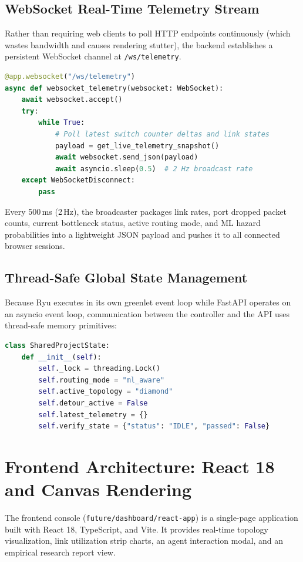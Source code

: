 \subsection{WebSocket Real-Time Telemetry Stream}
Rather than requiring web clients to poll HTTP endpoints continuously (which wastes bandwidth and causes rendering stutter), the backend establishes a persistent WebSocket channel at \texttt{/ws/telemetry}.
\begin{lstlisting}[language=Python,caption={FastAPI WebSocket telemetry broadcast loop.}]
@app.websocket("/ws/telemetry")
async def websocket_telemetry(websocket: WebSocket):
    await websocket.accept()
    try:
        while True:
            # Poll latest switch counter deltas and link states
            payload = get_live_telemetry_snapshot()
            await websocket.send_json(payload)
            await asyncio.sleep(0.5)  # 2 Hz broadcast rate
    except WebSocketDisconnect:
        pass
\end{lstlisting}
Every 500\,ms (2\,Hz), the broadcaster packages link rates, port dropped packet counts, current bottleneck status, active routing mode, and ML hazard probabilities into a lightweight JSON payload and pushes it to all connected browser sessions.

\subsection{Thread-Safe Global State Management}
Because Ryu executes in its own greenlet event loop while FastAPI operates on an asyncio event loop, communication between the controller and the API uses thread-safe memory primitives:
\begin{lstlisting}[language=Python]
class SharedProjectState:
    def __init__(self):
        self._lock = threading.Lock()
        self.routing_mode = "ml_aware"
        self.active_topology = "diamond"
        self.detour_active = False
        self.latest_telemetry = {}
        self.verify_state = {"status": "IDLE", "passed": False}
\end{lstlisting}

\section{Frontend Architecture: React 18 and Canvas Rendering}
The frontend console (\texttt{future/dashboard/react-app}) is a single-page application built with React 18, TypeScript, and Vite. It provides real-time topology visualization, link utilization strip charts, an agent interaction modal, and an empirical research report view.

